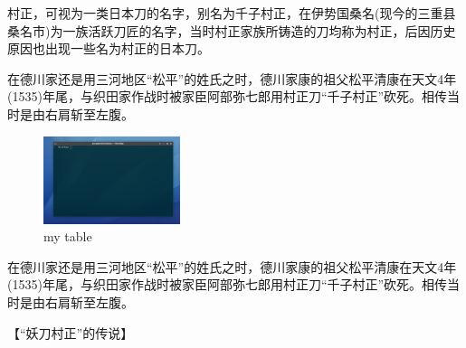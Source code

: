 \documentclass{article}
\begin{document}
村正，可视为一类日本刀的名字，别名为千子村正，在伊势国桑名(现今的三重县桑名市)为一族活跃刀匠的名字，当时村正家族所铸造的刀均称为村正，后因历史原因也出现一些名为村正的日本刀。\par

在德川家还是用三河地区“松平”的姓氏之时，德川家康的祖父松平清康在天文4年(1535)年尾，与织田家作战时被家臣阿部弥七郎用村正刀“千子村正”砍死。相传当时是由右肩斩至左腹。\par


\begin{figure}
\includegraphics [width=4cm,clip]{cun_c.png}
\caption{my table}
\end{figure}

在德川家还是用三河地区“松平”的姓氏之时，德川家康的祖父松平清康在天文4年(1535)年尾，与织田家作战时被家臣阿部弥七郎用村正刀“千子村正”砍死。相传当时是由右肩斩至左腹。\par

【“妖刀村正”的传说】\par
\end{document}
